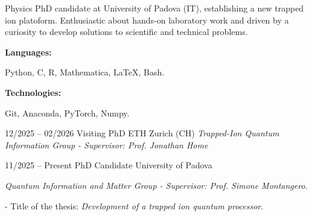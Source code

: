 \documentclass[9pt]{developercv} %
\begin{document}
\begin{minipage}[t]{0.46\textwidth}
	\vspace{-6pt}
 
	Physics PhD candidate at University of Padova (IT), establishing a new trapped ion platoform. Enthusiastic about hands-on laboratory work and driven by a curiosity to develop solutions to scientific and technical problems. \\
 
\end{minipage}
\hfill %
\begin{minipage}[t]{0.465\textwidth}
    \vspace{-6pt}
    
    \begin{minipage}[t]{0.2\textwidth}
        \textbf{Languages:}
    \end{minipage}
    \hfill
    \begin{minipage}[t]{0.73\textwidth}
      Python, C, R, Mathematica, \LaTeX, Bash.
    \end{minipage}
    \vspace{4mm}
    
    \begin{minipage}[t]{0.2\textwidth}
        \textbf{Technologies:}
    \end{minipage}
    \hfill
    \begin{minipage}[t]{0.73\textwidth}
      Git, Anaconda, PyTorch, Numpy.
    \end{minipage}
    
\end{minipage}


\vspace{-10 pt}

\begin{entrylist}
	\entry
        {12/2025 -- 02/2026}
		{Visiting PhD}
		{ETH  Zurich (CH)}
            {\textit{Trapped-Ion Quantum Information Group - Supervisor: Prof. Jonathan Home}
            }
\end{entrylist}

\begin{entrylist}
	\entry
        {11/2025 -- Present}
		{PhD Candidate}
		{University of Padova}
            {\textit{Quantum Information and Matter Group - Supervisor: Prof. Simone Montangero.}

            - Title of the thesis: \textit{Development of a trapped ion quantum processor}.
            }
\end{entrylist}
\end{document}
